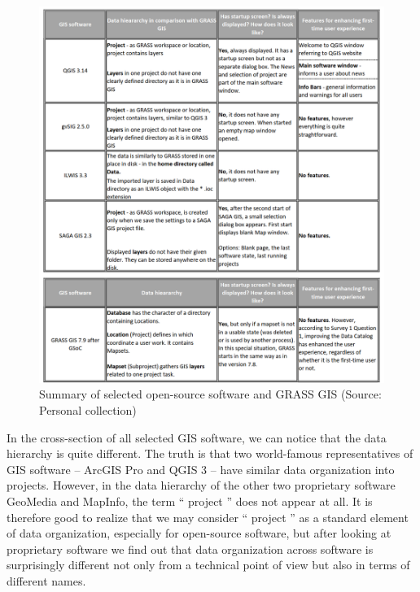 \documentclass[a4paper,10pt,twoside]{article}
\begin{document}
\vspace{0.3cm}
\begin{figure}[hbt!] 
\begin{center}
\includegraphics[width=15cm]{../pictures/open-source_software.png} 
\caption[Summary of selected open-source software and GRASS GIS]{Summary of selected open-source software and GRASS GIS (Source: Personal collection)}
\label{fig:open-source_software}
\end{center}
\end{figure}

\noindent In the cross-section of all selected GIS software, we can
notice that the data hierarchy is quite different. The truth is that
two world-famous representatives of GIS software -- ArcGIS Pro and
QGIS 3 -- have similar data organization into projects. However, in
the data hierarchy of the other two proprietary software GeoMedia and
MapInfo, the term `` project '' does not appear at all. It is
therefore good to realize that we may consider `` project '' as a
standard element of data organization, especially for open-source
software, but after looking at proprietary software we find out that
data organization across software is surprisingly different not only
from a technical point of view but also in terms of different names.
\end{document}
